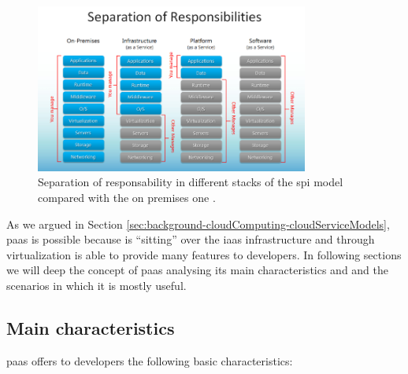 \begin{figure}
	\centering{}
	\includegraphics[width=0.8\textwidth]{chapters/background/images/separation-responsabilities.png}
	\caption[Separation of responsability in \acs{spi}]{Separation of responsability in different stacks
		of the \acf{spi} model compared with the on premises one \cite{spiRepsonabilities}.}
	\label{img:background-paas-spiResponsibilities}
\end{figure}

As we argued in Section \ref{sec:background-cloudComputing-cloudServiceModels}, \ac{paas} is possible
because is ``sitting'' over the \ac{iaas} infrastructure and through virtualization is able to provide many
features to developers. In following sections we will deep the concept of \ac{paas}
analysing its main characteristics and and the scenarios in which it is mostly useful. 

\subsection{Main characteristics}
\label{sec:background-paas-characteristics}
\ac{paas} offers to developers the following basic characteristics:

